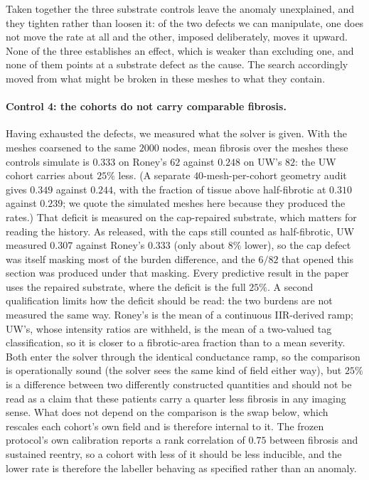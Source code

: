 \documentclass[11pt]{article}
\theoremstyle{definition}
\begin{document}
Taken together the three substrate controls leave the anomaly unexplained, and
they tighten rather than loosen it: of the two defects we can manipulate, one
does not move the rate at all and the other, imposed deliberately, moves it
upward. None of the three establishes an effect, which is weaker than
excluding one, and none of them points at a substrate defect as the cause. The
search accordingly moved from what might be broken in these meshes to what they
contain.

\paragraph{Control 4: the cohorts do not carry comparable fibrosis.} Having
exhausted the defects, we measured what the solver is given. With the meshes coarsened to the
same $2000$ nodes, mean fibrosis over the meshes these controls simulate is
$0.333$ on Roney's $62$ against $0.248$ on UW's $82$: the UW cohort carries
about $25\%$ less. (A separate $40$-mesh-per-cohort geometry audit gives $0.349$
against $0.244$, with the fraction of tissue above half-fibrotic at $0.310$
against $0.239$; we quote the simulated meshes here because they produced the
rates.) That deficit is measured on the cap-repaired substrate, which matters
for reading the history. As released, with the caps still counted as
half-fibrotic, UW measured $0.307$ against Roney's $0.333$ (only about $8\%$
lower), so the cap defect was itself masking most of the burden difference, and
the $6/82$ that opened this section was produced under that masking. Every
predictive result in the paper uses the repaired substrate, where the deficit is
the full $25\%$. A second qualification limits how the deficit should be read:
the two burdens are not measured the same way. Roney's is the mean of a
continuous IIR-derived ramp; UW's, whose intensity ratios are withheld, is the
mean of a two-valued tag classification, so it is closer to a fibrotic-area
fraction than to a mean severity. Both enter the solver through the identical
conductance ramp, so the comparison is operationally sound (the solver sees the
same kind of field either way), but $25\%$ is a difference between two
differently constructed quantities and should not be read as a claim that these
patients carry a quarter less fibrosis in any imaging sense. What does not
depend on the comparison is the swap below, which rescales each cohort's own
field and is therefore internal to it. The frozen protocol's own calibration
reports a rank correlation of $0.75$ between fibrosis and sustained reentry, so
a cohort with less of it should be less inducible, and the lower rate is
therefore the labeller behaving as specified rather than an anomaly.
\end{document}
